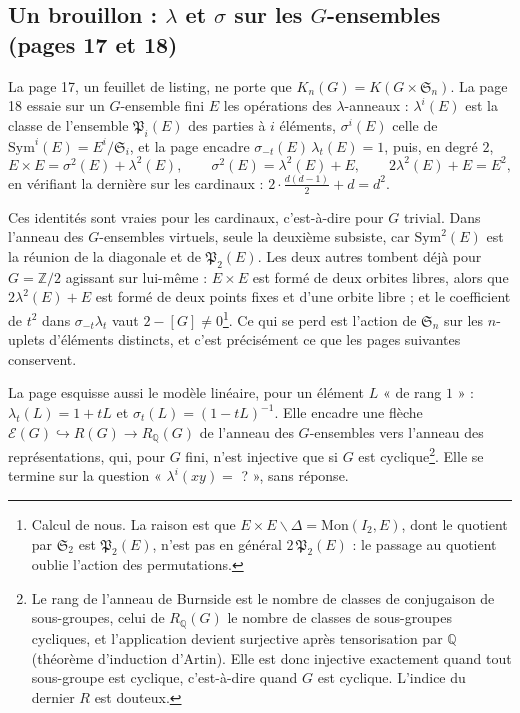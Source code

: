 \documentclass[11pt,a4paper]{article}
\begin{document}
\subsection*{Un brouillon : $\lambda$ et $\sigma$ sur les $G$-ensembles (pages 17 et 18)}

La page 17, un feuillet de listing, ne porte que $K_n(G) = K(G \times
\mathfrak{S}_n)$. La page 18 essaie sur un $G$-ensemble fini $E$ les
opérations des $\lambda$-anneaux : $\lambda^{i}(E)$ est la classe de
l'ensemble $\mathfrak{P}_i(E)$ des parties à $i$ éléments, $\sigma^{i}(E)$
celle de $\mathrm{Sym}^{i}(E) = E^{i}/\mathfrak{S}_i$, et la page encadre
$\sigma_{-t}(E)\,\lambda_t(E) = 1$, puis, en degré $2$,
\[
E \times E = \sigma^{2}(E) + \lambda^{2}(E), \qquad
\sigma^{2}(E) = \lambda^{2}(E) + E, \qquad
2\lambda^{2}(E) + E = E^{2},
\]
en vérifiant la dernière sur les cardinaux :
$2 \cdot \frac{d(d-1)}{2} + d = d^{2}$.

Ces identités sont vraies pour les cardinaux, c'est-à-dire pour $G$ trivial.
Dans l'anneau des $G$-ensembles virtuels, seule la deuxième subsiste, car
$\mathrm{Sym}^{2}(E)$ est la réunion de la diagonale et de
$\mathfrak{P}_2(E)$. Les deux autres tombent déjà pour $G = \mathbb{Z}/2$
agissant sur lui-même : $E \times E$ est formé de deux orbites libres, alors
que $2\lambda^{2}(E) + E$ est formé de deux points fixes et d'une orbite
libre ; et le coefficient de $t^{2}$ dans $\sigma_{-t}\lambda_t$ vaut
$2 - [G] \neq 0$\footnote{Calcul de nous. La raison est que
$E \times E \smallsetminus \Delta = \mathrm{Mon}(I_2, E)$, dont le quotient
par $\mathfrak{S}_2$ est $\mathfrak{P}_2(E)$, n'est pas en général
$2\,\mathfrak{P}_2(E)$ : le passage au quotient oublie l'action des
permutations.}. Ce qui se perd est l'action de $\mathfrak{S}_n$ sur les
$n$-uplets d'éléments distincts, et c'est précisément ce que les pages
suivantes conservent.

La page esquisse aussi le modèle linéaire, pour un élément $L$ « de rang
$1$ » : $\lambda_t(L) = 1 + tL$ et $\sigma_t(L) = (1 - tL)^{-1}$. Elle
encadre une flèche $\mathcal{E}(G) \hookrightarrow R(G) \to R_{\mathbb{Q}}(G)$
de l'anneau des $G$-ensembles vers l'anneau des représentations, qui,
pour $G$ fini, n'est injective que si $G$ est cyclique\footnote{Le rang de l'anneau de
Burnside est le nombre de classes de conjugaison de sous-groupes, celui de
$R_{\mathbb{Q}}(G)$ le nombre de classes de sous-groupes cycliques, et
l'application devient surjective après tensorisation par $\mathbb{Q}$
(théorème d'induction d'Artin). Elle est donc injective exactement quand
tout sous-groupe est cyclique, c'est-à-dire quand $G$ est cyclique.
L'indice du dernier $R$ est douteux.}. Elle se termine sur la question
« $\lambda^{i}(xy) = $ ? », sans réponse.
\end{document}

